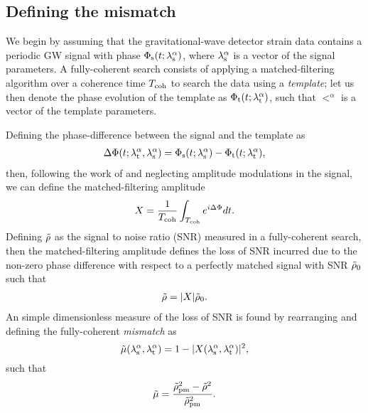 \documentclass[../full_thesis/full_thesis.tex]{subfiles}
\begin{document}
\subsection{Defining the mismatch}

We begin by assuming that the gravitational-wave detector strain data contains
a periodic GW signal with phase $\Phi_{\textrm{s}}(t; {\lambda}_\textrm{s}^{\alpha})$, where ${\lambda}_\textrm{s}^{\alpha}$
is a vector of the signal parameters. A fully-coherent search consists of
applying a matched-filtering algorithm over a coherence time $T_{\mathrm{coh}}$ to search
the data using a \emph{template}; let us then denote the phase evolution of the
template as $\Phi_{\textrm{t}}(t; {\lambda}_\textrm{t}^{\alpha})$, such that $\lt^{\alpha}$ is a vector of
the template parameters.

Defining the phase-difference between the signal and the template as
\begin{align}
\Delta\Phi(t; {\lambda}_\textrm{t}^{\alpha}, {\lambda}_\textrm{s}^{\alpha}) = \Phi_{\textrm{s}}(t; {\lambda}_\textrm{s}^{\alpha}) - \Phi_{\textrm{t}}(t; {\lambda}_\textrm{t}^{\alpha}),
\label{eqn: phase diff}
\end{align}
then, following the work of \citet{Prix2005} and neglecting amplitude modulations
in the signal, we can define the matched-filtering amplitude
\begin{equation}
X = \frac{1}{T_{\mathrm{coh}}}\int_{T_{\mathrm{coh}}}e^{i\Delta\Phi} dt.
\label{eqn: matched filtering amplitude}
\end{equation}
Defining $\tilde{\rho}$ as the signal to noise ratio (SNR) measured in a fully-coherent
search, then the matched-filtering amplitude defines the loss of SNR incurred
due to the non-zero phase difference with respect to a perfectly matched signal
with SNR $\tilde{\rho}_{0}$ such that
\begin{align}
\tilde{\rho} = |X|\tilde{\rho}_{0}.
\end{align}
An simple dimensionless measure of the loss of SNR is found by rearranging
and defining the fully-coherent \emph{mismatch} as
\begin{equation}
\tilde{\mu}({\lambda}_\textrm{s}^{\alpha}, {\lambda}_\textrm{t}^{\alpha}) = 1 - |X({\lambda}_\textrm{s}^{\alpha}, {\lambda}_\textrm{t}^{\alpha})|^{2},
\label{eqn: full mismatch}
\end{equation}
such that
\begin{equation}
\tilde{\mu} = \frac{\tilde{\rho}_{\mathrm{pm}}^{2} - \tilde{\rho}^{2}}
                {\tilde{\rho}^{2}_{\mathrm{pm}}}.
\label{eqn: numeric mismatch}
\end{equation}
\end{document}
